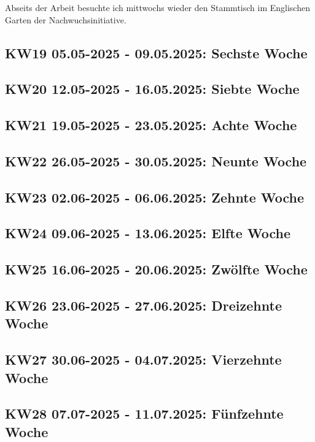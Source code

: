 Abseits der Arbeit besuchte ich mittwochs wieder den Stammtisch im Englischen Garten der Nachwuchsinitiative.


\subsection{KW19 05.05-2025 - 09.05.2025: Sechste Woche}


\subsection{KW20 12.05-2025 - 16.05.2025: Siebte Woche}


\subsection{KW21 19.05-2025 - 23.05.2025: Achte Woche}


\subsection{KW22 26.05-2025 - 30.05.2025: Neunte Woche}


\subsection{KW23 02.06-2025 - 06.06.2025: Zehnte Woche}


\subsection{KW24 09.06-2025 - 13.06.2025: Elfte Woche}


\subsection{KW25 16.06-2025 - 20.06.2025: Zwölfte Woche}


\subsection{KW26 23.06-2025 - 27.06.2025: Dreizehnte Woche}


\subsection{KW27 30.06-2025 - 04.07.2025: Vierzehnte Woche}


\subsection{KW28 07.07-2025 - 11.07.2025: Fünfzehnte Woche}



